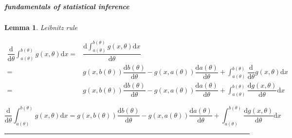 \documentclass[
]{book}
\newtheorem{lemma}{Lemma}[chapter]
\theoremstyle{definition}
\theoremstyle{definition}
\theoremstyle{definition}
\theoremstyle{definition}
\theoremstyle{remark}
\begin{document}
\subparagraph{fundamentals of statistical inference}\label{fundamentals-of-statistical-inference}

\begin{lemma}
\protect\hypertarget{lem:unnamed-chunk-35}{}\label{lem:unnamed-chunk-35}Leibnitz rule
\end{lemma}

\[
\begin{aligned}
\dfrac{\mathrm{d}}{\mathrm{d}\theta}\int_{a\left(\theta\right)}^{b\left(\theta\right)}g\left(x,\theta\right)\mathrm{d}x= & \dfrac{\mathrm{d}\int_{a\left(\theta\right)}^{b\left(\theta\right)}g\left(x,\theta\right)\mathrm{d}x}{\mathrm{d}\theta}\\
= & g\left(x,b\left(\theta\right)\right)\dfrac{\mathrm{d}b\left(\theta\right)}{\mathrm{d}\theta}-g\left(x,a\left(\theta\right)\right)\dfrac{\mathrm{d}a\left(\theta\right)}{\mathrm{d}\theta}+\int_{a\left(\theta\right)}^{b\left(\theta\right)}\dfrac{\mathrm{d}}{\mathrm{d}\theta}g\left(x,\theta\right)\mathrm{d}x\\
= & g\left(x,b\left(\theta\right)\right)\dfrac{\mathrm{d}b\left(\theta\right)}{\mathrm{d}\theta}-g\left(x,a\left(\theta\right)\right)\dfrac{\mathrm{d}a\left(\theta\right)}{\mathrm{d}\theta}+\int_{a\left(\theta\right)}^{b\left(\theta\right)}\dfrac{\mathrm{d}g\left(x,\theta\right)}{\mathrm{d}\theta}\mathrm{d}x
\end{aligned}
\]

\[
\dfrac{\mathrm{d}}{\mathrm{d}\theta}\int_{a\left(\theta\right)}^{b\left(\theta\right)}g\left(x,\theta\right)\mathrm{d}x=g\left(x,b\left(\theta\right)\right)\dfrac{\mathrm{d}b\left(\theta\right)}{\mathrm{d}\theta}-g\left(x,a\left(\theta\right)\right)\dfrac{\mathrm{d}a\left(\theta\right)}{\mathrm{d}\theta}+\int_{a\left(\theta\right)}^{b\left(\theta\right)}\dfrac{\mathrm{d}g\left(x,\theta\right)}{\mathrm{d}\theta}\mathrm{d}x
\]

\begin{center}\rule{0.5\linewidth}{0.5pt}\end{center}
\end{document}
